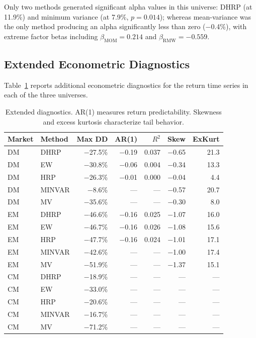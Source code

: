 \documentclass{article}
\begin{document}
Only two methods generated significant alpha values in this universe: DHRP (at 11.9\%) and minimum variance (at 7.9\%, $p = 0.014$); whereas mean-variance was the only method producing an alpha significantly less than zero ($-$0.4\%), with extreme factor betas including $\beta_{\text{MOM}} = 0.214$ and $\beta_{\text{RMW}} = -0.559$.

\subsection{Extended Econometric Diagnostics}

Table~\ref{tab:econometric} reports additional econometric diagnostics for the return time series in each of the three universes.

\begin{table}[t]
\centering
\caption{Extended diagnostics. AR(1) measures return predictability. Skewness and excess kurtosis characterize tail behavior.}
\label{tab:econometric}
\begin{tabular}{llrrrrr}
\toprule
Market & Method & Max DD & AR(1) & $R^2$ & Skew & ExKurt \\
\midrule
DM & DHRP & $-$27.5\% & $-$0.19 & 0.037 & $-$0.65 & 21.3 \\
DM & EW & $-$30.8\% & $-$0.06 & 0.004 & $-$0.34 & 13.3 \\
DM & HRP & $-$26.3\% & $-$0.01 & 0.000 & $-$0.04 & 4.4 \\
DM & MINVAR & $-$8.6\% & --- & --- & $-$0.57 & 20.7 \\
DM & MV & $-$35.6\% & --- & --- & $-$0.30 & 8.0 \\
\midrule
EM & DHRP & $-$46.6\% & $-$0.16 & 0.025 & $-$1.07 & 16.0 \\
EM & EW & $-$46.7\% & $-$0.16 & 0.026 & $-$1.08 & 15.6 \\
EM & HRP & $-$47.7\% & $-$0.16 & 0.024 & $-$1.01 & 17.1 \\
EM & MINVAR & $-$42.6\% & --- & --- & $-$1.00 & 17.4 \\
EM & MV & $-$51.9\% & --- & --- & $-$1.37 & 15.1 \\
\midrule
CM & DHRP & $-$18.9\% & --- & --- & --- & --- \\
CM & EW & $-$33.0\% & --- & --- & --- & --- \\
CM & HRP & $-$20.6\% & --- & --- & --- & --- \\
CM & MINVAR & $-$16.7\% & --- & --- & --- & --- \\
CM & MV & $-$71.2\% & --- & --- & --- & --- \\
\bottomrule
\end{tabular}
\end{table}
\end{document}
